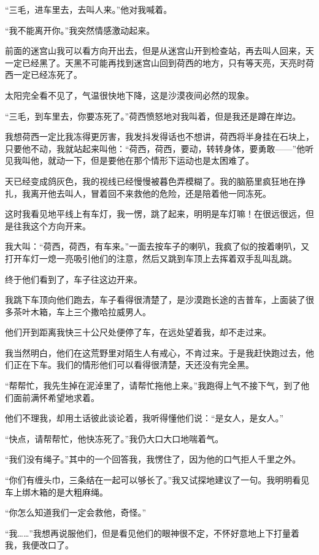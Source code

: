 \par “三毛，进车里去，去叫人来。”他对我喊着。
\par “我不能离开你。”我突然情感激动起来。
\par 前面的迷宫山我可以看方向开出去，但是从迷宫山开到检查站，再去叫人回来，天一定已经黑了。天黑不可能再找到迷宫山回到荷西的地方，只有等天亮，天亮时荷西一定已经冻死了。
\par 太阳完全看不见了，气温很快地下降，这是沙漠夜间必然的现象。
\par “三毛，到车里去，你要冻死了。”荷西愤怒地对我叫着，但是我还是蹲在岸边。
\par 我想荷西一定比我冻得更厉害，我发抖发得话也不想讲，荷西将半身挂在石块上，只要他不动，我就站起来叫他：“荷西，荷西，要动，转转身体，要勇敢——”他听见我叫他，就动一下，但是要他在那个情形下运动也是太困难了。
\par 天已经变成鸽灰色，我的视线已经慢慢被暮色弄模糊了。我的脑筋里疯狂地在挣扎，我离开他去叫人，冒着回不来救他的危险，还是陪着他一同冻死。
\par 这时我看见地平线上有车灯，我一愣，跳了起来，明明是车灯嘛！在很远很远，但是往我这个方向开来。
\par 我大叫：“荷西，荷西，有车来。”一面去按车子的喇叭，我疯了似的按着喇叭，又打开车灯一熄一亮吸引他们的注意，然后又跳到车顶上去挥着双手乱叫乱跳。
\par 终于他们看到了，车子往这边开来。
\par 我跳下车顶向他们跑去，车子看得很清楚了，是沙漠跑长途的吉普车，上面装了很多茶叶木箱，车上三个撒哈拉威男人。
\par 他们开到距离我快三十公尺处便停了车，在远处望着我，却不走过来。
\par 我当然明白，他们在这荒野里对陌生人有戒心，不肯过来。于是我赶快跑过去，他们正在下车。我们的情形他们可以看得很清楚，天还没有完全黑。
\par “帮帮忙，我先生掉在泥淖里了，请帮忙拖他上来。”我跑得上气不接下气，到了他们面前满怀希望地求着。
\par 他们不理我，却用土话彼此谈论着，我听得懂他们说：“是女人，是女人。”
\par “快点，请帮帮忙，他快冻死了。”我仍大口大口地喘着气。
\par “我们没有绳子。”其中的一个回答我，我愣住了，因为他的口气拒人千里之外。
\par “你们有缠头巾，三条结在一起可以够长了。”我又试探地建议了一句。我明明看见车上绑木箱的是大粗麻绳。
\par “你怎么知道我们一定会救他，奇怪。”
\par “我……”我想再说服他们，但是看见他们的眼神很不定，不怀好意地上下打量着我，我便改口了。

